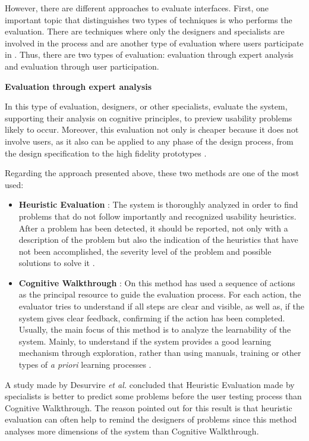 However, there are different approaches to evaluate interfaces. First, one important topic that distinguishes two types of techniques is who performs the evaluation. There are techniques where only the designers and specialists are involved in the process and are another type of evaluation where users participate in \cite{humanComputerInteraction}. Thus, there are two types of evaluation: evaluation through expert analysis and evaluation through user participation.

\bigskip

\textbf{Evaluation through expert analysis}

In this type of evaluation, designers, or other specialists, evaluate the system, supporting their analysis on cognitive principles, to preview usability problems likely to occur. Moreover, this evaluation not only is cheaper because it does not involve users, as it also can be applied to any phase of the design process, from the design specification to the high fidelity prototypes \cite{humanComputerInteraction}.

Regarding the approach presented above, these two methods are one of the most used:

\begin{itemize}
	\item \textbf{Heuristic Evaluation} \cite{heuristicEvaluationOfUserInterfaces}: The system is thoroughly analyzed in order to find problems that do not follow importantly and recognized usability heuristics. After a problem has been detected, it should be reported, not only with a description of the problem but also the indication of the heuristics that have not been accomplished, the severity level of the problem and possible solutions to solve it \cite{usabilityEngineering}.
	\item \textbf{Cognitive Walkthrough} \cite{cognitiveWalkthroughs}: On this method has used a sequence of actions as the principal resource to guide the evaluation process. For each action, the evaluator tries to understand if all steps are clear and visible, as well as, if the system gives clear feedback, confirming if the action has been completed. Usually, the main focus of this method is to analyze the learnability of the system. Mainly, to understand if the system provides a good learning mechanism through exploration, rather than using manuals, training or other types of \textit{a priori} learning processes \cite{humanComputerInteraction}.
\end{itemize}

A study made by Desurvire \textit{et al.} \cite{WhatIsGainedAndLostWhenUsingMethodsOtherThanEmpiricalTesting} concluded that Heuristic Evaluation made by specialists is better to predict some problems before the user testing process than Cognitive Walkthrough. The reason pointed out for this result is that heuristic evaluation can often help to remind the designers of problems since this method analyses more dimensions of the system than Cognitive Walkthrough.


